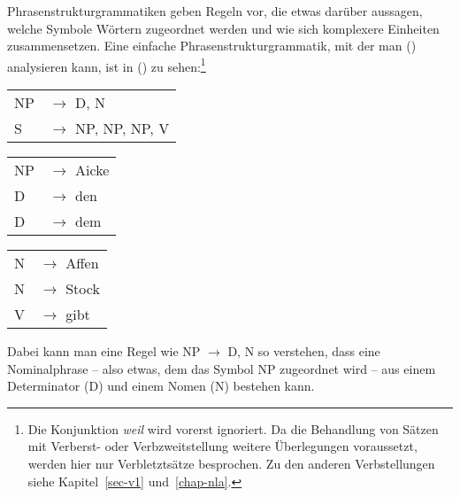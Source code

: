 Phrasenstrukturgrammatiken geben Regeln vor, die etwas darüber aussagen, welche Symbole Wörtern
zugeordnet werden und wie sich komplexere Einheiten zusammensetzen. Eine einfache Phrasenstrukturgrammatik,
mit der man () analysieren kann, ist in () zu sehen:\footnote{
  Die Konjunktion \emph{weil} wird vorerst ignoriert. Da die Behandlung von Sätzen mit Verberst- oder
  Verbzweitstellung weitere Überlegungen voraussetzt, werden hier nur Verbletztsätze besprochen.
  Zu den anderen Verbstellungen siehe Kapitel~\ref{sec-v1} und~\ref{chap-nla}.%
}
\ea
\label{bsp-grammatik-psg}
\begin{tabular}[t]{@{}l@{ }l}
{NP} & {$\to$ D, N}\\          
{S}  & {$\to$ NP, NP, NP, V}
\end{tabular}\hspace{2cm}%
\begin{tabular}[t]{@{}l@{ }l}
{NP} & {$\to$ Aicke}\\
{D}  & {$\to$ den}\\
{D}  & {$\to$ dem}\\
\end{tabular}\hspace{8mm}
\begin{tabular}[t]{@{}l@{ }l}
{N} & {$\to$ Affen}\\
{N} & {$\to$ Stock}\\
{V} & {$\to$ gibt}\\
\end{tabular}
\z
Dabei kann man eine Regel wie NP $\to$\is{$\to$} D, N so verstehen, dass eine Nominalphrase -- also etwas,
dem das Symbol NP zugeordnet wird -- aus einem Determinator (D) und einem Nomen (N) bestehen kann.

